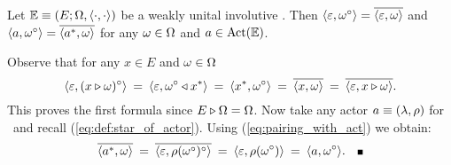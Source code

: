 \begin{lemma_sec}  \label{lem:weakly_unital_involutive_context}
Let\/ $\mathbb{E} \equiv (E; \Omega, \langle\cdot, \cdot\rangle)$ be a weakly unital involutive \context\@.
Then\/ $\langle \varepsilon,\omega^\circ \rangle = \overline{\langle \varepsilon,\omega \rangle}$ and\/
$\langle a,\omega^\circ \rangle = \overline{\langle a^*,\omega \rangle}$
for any\/ $\omega \in \Omega$ and\/ $a\in \mbox{\rm Act}(\mathbb{E})$.
\end{lemma_sec}
\begin{proof*}
Observe that for any $x\in E$ and $\omega \in \Omega$
$$ \langle \varepsilon,(x \triangleright \omega)^\circ \rangle
      \:=\:  \langle \varepsilon,\omega^\circ \triangleleft x^* \rangle
      \:=\:  \langle x^*,\omega^\circ \rangle
      \:=\:  \overline{\langle x,\omega \rangle}
      \:=\:  \overline{\langle \varepsilon,x \triangleright  \omega \rangle}. $$
This proves the first formula since $E\triangleright \Omega = \Omega$.
Now take any actor $a\equiv (\lambda,\rho)$ for \EE\ and recall (\ref{eq:def:star_of_actor}).
Using (\ref{eq:pairing_with_act}) we obtain:
$$ \overline{\pair{a^*}{\om}}
      \:=\:  \overline{\pair{\eps}{\rho(\om\conj)\conj}}
      \:=\:  \pair{\eps}{\rho(\om\conj)}
      \:=\:  \pair{a}{\om\conj}.
      \hspace{1em} \qed $$
\end{proof*}
